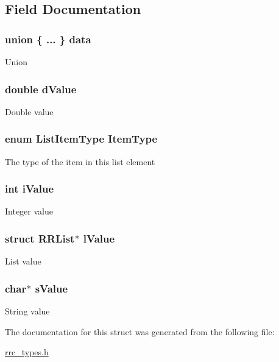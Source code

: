 \subsection{Field Documentation}
\hypertarget{struct_r_r_list_item_ac5bcd1de26b6efabd485bce48ecf8a8a}{
\subsubsection[{data}]{\setlength{\rightskip}{0pt plus 5cm}union \{ ... \}   data}}\label{struct_r_r_list_item_ac5bcd1de26b6efabd485bce48ecf8a8a}
Union \hypertarget{struct_r_r_list_item_ada9c8889b93084880c4bed9c9feeaa42}{
\subsubsection[{d\-Value}]{\setlength{\rightskip}{0pt plus 5cm}double d\-Value}}\label{struct_r_r_list_item_ada9c8889b93084880c4bed9c9feeaa42}
Double value \hypertarget{struct_r_r_list_item_a25c3073c0827a19b3ec0a0ea6d2ad5df}{
\subsubsection[{Item\-Type}]{\setlength{\rightskip}{0pt plus 5cm}enum {\bf List\-Item\-Type} Item\-Type}}\label{struct_r_r_list_item_a25c3073c0827a19b3ec0a0ea6d2ad5df}
The type of the item in this list element \hypertarget{struct_r_r_list_item_ac5de02e20d85842177a764866cef4ad2}{
\subsubsection[{i\-Value}]{\setlength{\rightskip}{0pt plus 5cm}int i\-Value}}\label{struct_r_r_list_item_ac5de02e20d85842177a764866cef4ad2}
Integer value \hypertarget{struct_r_r_list_item_afa0e0bc7c68d478c6819e82bedb5525f}{
\subsubsection[{l\-Value}]{\setlength{\rightskip}{0pt plus 5cm}struct {\bf R\-R\-List}$\ast$ l\-Value}}\label{struct_r_r_list_item_afa0e0bc7c68d478c6819e82bedb5525f}
List value \hypertarget{struct_r_r_list_item_a80e5abe988376805a91503e24e8d1efd}{
\subsubsection[{s\-Value}]{\setlength{\rightskip}{0pt plus 5cm}char$\ast$ s\-Value}}\label{struct_r_r_list_item_a80e5abe988376805a91503e24e8d1efd}
String value 

The documentation for this struct was generated from the following file\-:\begin{DoxyCompactItemize}
\item 
\hyperlink{rrc__types_8h}{rrc\-\_\-types.\-h}\end{DoxyCompactItemize}
